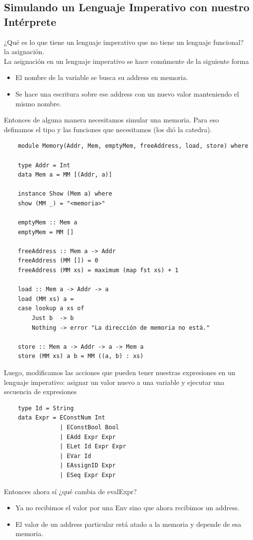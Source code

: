 \documentclass[10pt,a4paper]{article}
\begin{document}
\subsection*{Simulando un Lenguaje Imperativo con nuestro Intérprete}
¿Qué es lo que tiene un lenguaje imperativo que no tiene un lenguaje funcional? la asignación. \\
La asignación en un lenguaje imperativo se hace comúmente de la siguiente forma 
\begin{itemize}
    \item El nombre de la variable se busca su address en memoria. 
    \item Se hace una escritura sobre ese address con un nuevo valor manteniendo el mismo nombre.
\end{itemize}
Entonces de alguna manera necesitamos simular una memoria. Para eso definamos el tipo y las funciones que necesitamos (los dió la catedra). 
\begin{lstlisting}
    module Memory(Addr, Mem, emptyMem, freeAddress, load, store) where

    type Addr = Int
    data Mem a = MM [(Addr, a)]

    instance Show (Mem a) where
    show (MM _) = "<memoria>"

    emptyMem :: Mem a
    emptyMem = MM []

    freeAddress :: Mem a -> Addr
    freeAddress (MM []) = 0
    freeAddress (MM xs) = maximum (map fst xs) + 1

    load :: Mem a -> Addr -> a
    load (MM xs) a =
    case lookup a xs of
        Just b  -> b
        Nothing -> error "La dirección de memoria no está."

    store :: Mem a -> Addr -> a -> Mem a
    store (MM xs) a b = MM ((a, b) : xs)

\end{lstlisting}
Luego, modificamos las acciones que pueden tener nuestras expresiones en un lenguaje imperativo: asignar un valor nuevo a una variable y ejecutar una secuencia de expresiones  
\begin{lstlisting}
    type Id = String 
    data Expr = EConstNum Int 
                | EConstBool Bool 
                | EAdd Expr Expr  
                | ELet Id Expr Expr 
                | EVar Id
                | EAssignID Expr 
                | ESeq Expr Expr 
\end{lstlisting}
Entonces ahora sí ¿qué cambia de evalExpr? 
\begin{itemize}
    \item Ya no recibimos el valor por una Env sino que ahora recibimos un address.
    \item El valor de un address particular está atado a la memoria y depende de esa memoria. 
\end{itemize}
\end{document}
